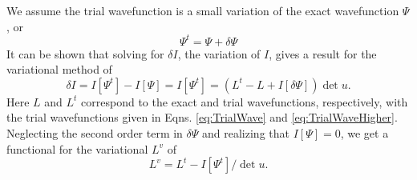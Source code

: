 \documentclass[preprint,showpacs,showkeys,preprintnumbers,amsmath,amssymb,longbibliography,pra,aps]{revtex4-1}
\begin{document}
We assume the trial wavefunction is a small variation of the exact wavefunction
$\Psi$, or
\begin{equation}
\Psi^t = \Psi + \delta \Psi
\label{eq:PsiTrialRelation}
\end{equation}
It can be shown that solving for $\delta I$, the variation of $I$, gives a
result for the variational method of
\begin{equation}
\delta I = I[\Psi^t] - I[\Psi] = I[\Psi^t] = (L^t - L + I[\delta \Psi]) \det u.
\label{eq:IlPsiVariation}
\end{equation}
Here $L$ and $L^t$ correspond to the exact and trial wavefunctions,
respectively, with the trial wavefunctions given in Eqns. \ref{eq:TrialWave}
and \ref{eq:TrialWaveHigher}. Neglecting the second order term in
$\delta \Psi$ and realizing that $I[\Psi] = 0$, we get a functional for the
variational $L^v$ of
\begin{equation}
L^v = L^t - I[\Psi^t] / \det u.
\label{eq:ComplexKohnVariation}
\end{equation}
\end{document}
